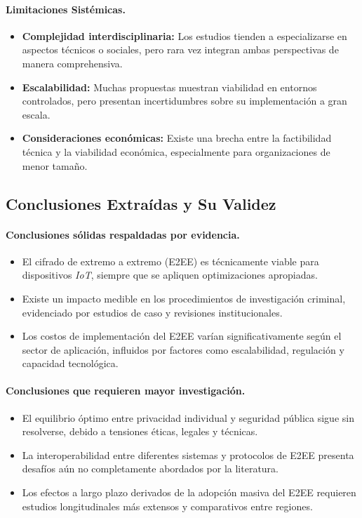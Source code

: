 \documentclass[spanish,12pt,a4paper]{article}
\begin{document}
\begin{multicols}{2}
	\paragraph{Limitaciones Sistémicas.}
	\begin{itemize}
		\item \textbf{Complejidad interdisciplinaria:} Los estudios tienden a especializarse en aspectos técnicos o sociales, pero rara vez integran ambas perspectivas de manera comprehensiva.
		\item \textbf{Escalabilidad:} Muchas propuestas muestran viabilidad en entornos controlados, pero presentan incertidumbres sobre su implementación a gran escala.
		\item \textbf{Consideraciones económicas:} Existe una brecha entre la factibilidad técnica y la viabilidad económica, especialmente para organizaciones de menor tamaño.
	\end{itemize}
	\end{multicols}
	\subsection*{Conclusiones Extraídas y Su Validez}
		\begin{multicols}{2}
	
	\paragraph{Conclusiones sólidas respaldadas por evidencia.}
	\begin{itemize}
		\item El cifrado de extremo a extremo (E2EE) es técnicamente viable para dispositivos \textit{IoT}, siempre que se apliquen optimizaciones apropiadas.
		\item Existe un impacto medible en los procedimientos de investigación criminal, evidenciado por estudios de caso y revisiones institucionales.
		\item Los costos de implementación del E2EE varían significativamente según el sector de aplicación, influidos por factores como escalabilidad, regulación y capacidad tecnológica.
	\end{itemize}
	
	\paragraph{Conclusiones que requieren mayor investigación.}
	\begin{itemize}
		\item El equilibrio óptimo entre privacidad individual y seguridad pública sigue sin resolverse, debido a tensiones éticas, legales y técnicas.
		\item La interoperabilidad entre diferentes sistemas y protocolos de E2EE presenta desafíos aún no completamente abordados por la literatura.
		\item Los efectos a largo plazo derivados de la adopción masiva del E2EE requieren estudios longitudinales más extensos y comparativos entre regiones.
	\end{itemize}
		\end{multicols}
\end{document}
